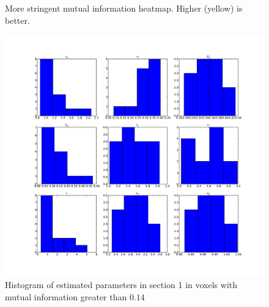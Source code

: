 \begin{figure}
\centering
{}
\caption{More stringent mutual information heatmap. Higher (yellow) is better.}
\label{fig:SimSNRhm}
\end{figure}

\begin{figure} %
\centering
\includegraphics[clip=true,trim=2.5cm 2cm 2cm 1cm,width=15cm]{images/slicesim_hist1}
\caption{Histogram of estimated parameters in section 1 in voxels with mutual information greater
than $0.14$}
\label{fig:slicesim_hist1}
\end{figure}

